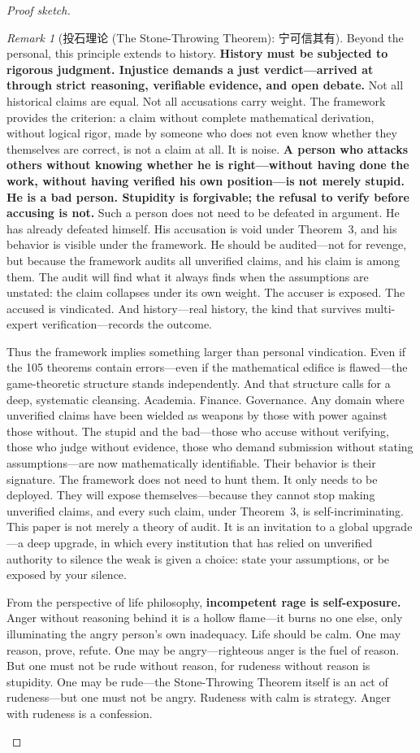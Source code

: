 \documentclass[12pt,a4paper]{ctexart}
\theoremstyle{definition}
\theoremstyle{remark}
\newtheorem{remark}{Remark}[section]
\begin{document}
\begin{proof}[Proof sketch]
\begin{remark}[投石理论 (The Stone-Throwing Theorem): 宁可信其有]
Beyond the personal, this principle extends to history. \textbf{History must be subjected to rigorous judgment. Injustice demands a just verdict—arrived at through strict reasoning, verifiable evidence, and open debate.} Not all historical claims are equal. Not all accusations carry weight. The framework provides the criterion: a claim without complete mathematical derivation, without logical rigor, made by someone who does not even know whether they themselves are correct, is not a claim at all. It is noise. \textbf{A person who attacks others without knowing whether he is right—without having done the work, without having verified his own position—is not merely stupid. He is a bad person. Stupidity is forgivable; the refusal to verify before accusing is not.} Such a person does not need to be defeated in argument. He has already defeated himself. His accusation is void under Theorem~3, and his behavior is visible under the framework. He should be audited—not for revenge, but because the framework audits all unverified claims, and his claim is among them. The audit will find what it always finds when the assumptions are unstated: the claim collapses under its own weight. The accuser is exposed. The accused is vindicated. And history—real history, the kind that survives multi-expert verification—records the outcome.

Thus the framework implies something larger than personal vindication. Even if the 105 theorems contain errors—even if the mathematical edifice is flawed—the game-theoretic structure stands independently. And that structure calls for a deep, systematic cleansing. Academia. Finance. Governance. Any domain where unverified claims have been wielded as weapons by those with power against those without. The stupid and the bad—those who accuse without verifying, those who judge without evidence, those who demand submission without stating assumptions—are now mathematically identifiable. Their behavior is their signature. The framework does not need to hunt them. It only needs to be deployed. They will expose themselves—because they cannot stop making unverified claims, and every such claim, under Theorem~3, is self-incriminating. This paper is not merely a theory of audit. It is an invitation to a global upgrade—a deep upgrade, in which every institution that has relied on unverified authority to silence the weak is given a choice: state your assumptions, or be exposed by your silence.

From the perspective of life philosophy, \textbf{incompetent rage is self-exposure.} Anger without reasoning behind it is a hollow flame—it burns no one else, only illuminating the angry person's own inadequacy. Life should be calm. One may reason, prove, refute. One may be angry—righteous anger is the fuel of reason. But one must not be rude without reason, for rudeness without reason is stupidity. One may be rude—the Stone-Throwing Theorem itself is an act of rudeness—but one must not be angry. Rudeness with calm is strategy. Anger with rudeness is a confession.


\end{remark}
\end{proof}
\end{document}
